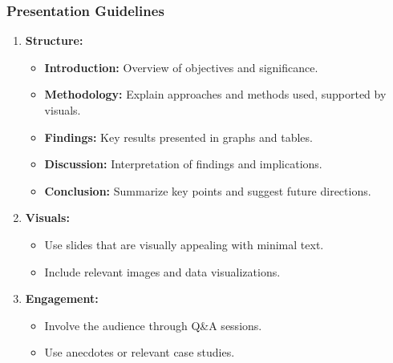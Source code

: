 \documentclass[aspectratio=169]{beamer}
\begin{document}
\begin{frame}[fragile]
    \frametitle{Presentation Guidelines}
    \begin{enumerate}
        \item \textbf{Structure:}
            \begin{itemize}
                \item \textbf{Introduction:} Overview of objectives and significance.
                \item \textbf{Methodology:} Explain approaches and methods used, supported by visuals.
                \item \textbf{Findings:} Key results presented in graphs and tables.
                \item \textbf{Discussion:} Interpretation of findings and implications.
                \item \textbf{Conclusion:} Summarize key points and suggest future directions.
            \end{itemize}
        \item \textbf{Visuals:}
            \begin{itemize}
                \item Use slides that are visually appealing with minimal text.
                \item Include relevant images and data visualizations.
            \end{itemize}
        \item \textbf{Engagement:}
            \begin{itemize}
                \item Involve the audience through Q\&A sessions.
                \item Use anecdotes or relevant case studies.
            \end{itemize}
    \end{enumerate}
\end{frame}
\end{document}
